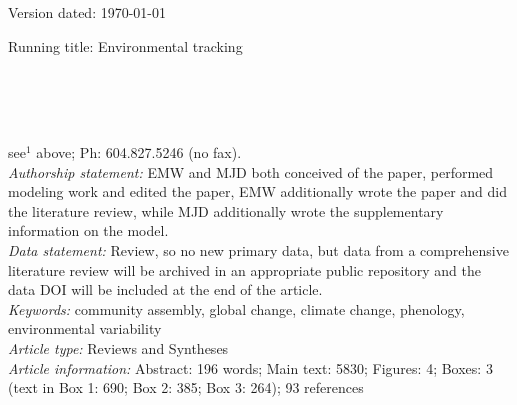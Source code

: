 \documentclass[11pt,letterpaper]{article}
\begin{document}
\begin{flushright}
Version dated: \today
\end{flushright}
\bigskip
\noindent Running title: Environmental tracking 
\bigskip
\medskip
\begin{center}
\\
\bigskip
{}\\
\\
\medskip
\end{center}
 see$^{1}$ above; Ph: 604.827.5246 (no fax).\\

\noindent \emph{Authorship statement:} EMW and MJD both conceived of the paper, performed modeling work and edited the paper, EMW additionally wrote the paper and did the literature review, while MJD additionally wrote the supplementary information on the model.  \\
\noindent \emph{Data statement:} Review, so no new primary data, but data from a comprehensive literature review will be archived in an appropriate public repository and the data DOI will be included at the end of the article. \\
\noindent \emph{Keywords:} community assembly, global change, climate change, phenology, environmental variability\\
\noindent \emph{Article type:} Reviews and Syntheses\\
\noindent \emph{Article information:} Abstract: 196 words; Main text: 5830; Figures: 4; Boxes: 3 (text in Box 1: 690; Box 2: 385; Box 3: 264); 93 references
\newpage
\end{document}

